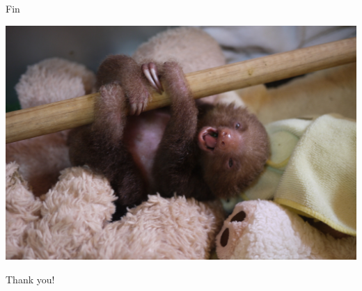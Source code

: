 \documentclass[xcolor=pdftex,t,11pt]{beamer}
\begin{document}
\begin{frame}[fragile]{Fin}

\begin{center}
\includegraphics[width=.7\textwidth]{sloth-small.jpg}

\Huge
 Thank you!
\end{center}

\end{frame}
\end{document}
